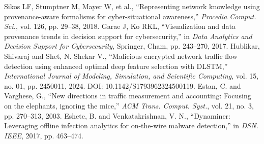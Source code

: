 \documentclass[conference]{IEEEtran}
\begin{document}
\begin{thebibliography}{00}
     Sikos LF, Stumptner M, Mayer W, et al., ``Representing network knowledge using provenance-aware formalisms for cyber-situational awareness,'' \textit{Procedia Comput. Sci.}, vol. 126, pp. 29–38, 2018.
     Garae J, Ko RKL, ``Visualization and data provenance trends in decision support for cybersecurity,'' in \textit{Data Analytics and Decision Support for Cybersecurity}, Springer, Cham, pp. 243–270, 2017.
     Hublikar, Shivaraj and Shet, N. Shekar V., ``Malicious encrypted network traffic flow detection using enhanced optimal deep feature selection with DLSTM,'' \textit{International Journal of Modeling, Simulation, and Scientific Computing}, vol. 15, no. 01, pp. 2450011, 2024. DOI: 10.1142/S1793962324500119.
     Estan, C. and Varghese, G., ``New directions in traffic measurement and accounting: Focusing on the elephants, ignoring the mice,'' \textit{ACM Trans. Comput. Syst.}, vol. 21, no. 3, pp. 270–313, 2003.
     Eshete, B. and Venkatakrishnan, V. N., ``Dynaminer: Leveraging offline infection analytics for on-the-wire malware detection,'' in \textit{DSN. IEEE}, 2017, pp. 463–474.
\end{thebibliography}

\vspace{12pt}
\end{document}
